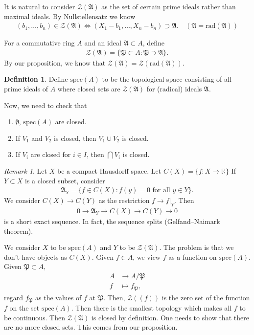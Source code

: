 \documentclass[12pt]{report}
\theoremstyle{plain}
\theoremstyle{remark}
\newtheorem*{remark}{Remark}
\theoremstyle{definition}
\newtheorem{definition}[theorem]{Definition}
\newcommand{\R}{\mathbb{R}}
\begin{document}
It is natural to consider $\mathcal{Z}(\mathfrak{A})$ as the set of certain prime ideals rather than maximal ideals. By Nullstellensatz we know
\begin{align*}
    (b_1,\dots,b_n)\in\mathcal{Z}(\mathfrak{A})\iff (X_1-b_1,\dots,X_n-b_n)\supset \mathfrak{A}.\quad (\mathfrak{A}=\mathrm{rad}(\mathfrak{A}))
\end{align*}

For a commutative ring $A$ and an ideal $\mathfrak{A}\subset A$, define
\begin{align*}
    \mathcal{Z}(\mathfrak{A})=\{\mathfrak{P}\subset A:\mathfrak{P}\supset\mathfrak{A}\}.
\end{align*}
By our proposition, we know that $\mathcal{Z}(\mathfrak{A})=\mathcal{Z}(\mathrm{rad}(\mathfrak{A}))$.

\begin{definition}
    Define $\mathrm{spec}(A)$ to be the topological space consisting of all prime ideals of $A$ where closed sets are $\mathcal{Z}(\mathfrak{A})$ for (radical) ideals $\mathfrak{A}$.
\end{definition}

Now, we need to check that
\begin{enumerate}
    \item $\emptyset$, $\mathrm{spec}(A)$ are closed.
    \item If $V_1$ and $V_2$ is closed, then $V_1\cup V_2$ is closed.
    \item If $V_i$ are closed for $i\in I$, then $\bigcap V_i$ is closed.
\end{enumerate}

\begin{remark}
    Let $X$ be a compact Hausdorff space. Let $C(X)=\{f:X\to\R\}$ If $Y\subset X$ is a closed subset, consider
    \begin{align*}
        \mathfrak{A}_Y=\{f\in C(X):f(y)=0\text{ for all }y\in Y\}.
    \end{align*}
    We consider $C(X)\to C(Y)$ as the restriction $f\to f|_Y$. Then
    \begin{align*}
        0\to\mathfrak{A}_Y\to C(X)\to C(Y)\to 0
    \end{align*}
    is a short exact sequence. In fact, the sequence splits (Gelfand–Naimark theorem).
\end{remark}

We consider $X$ to be $\mathrm{spec}(A)$ and $Y$ to be $\mathcal{Z}(\mathfrak{A})$. The problem is that we don't have objects as $C(X)$. Given $f\in A$, we view $f$ as a function on $\mathrm{spec}(A)$. Given $\mathfrak{P}\subset A$, 
\begin{align*}
    A &\to A/\mathfrak{P} \\
    f &\mapsto f_\mathfrak{P},
\end{align*}
regard $f_\mathfrak{P}$ as the values of $f$ at $\mathfrak{P}$. Then, $\mathcal{Z}((f))$ is the zero set of the function $f$ on the set $\mathrm{spec}(A)$. Then there is the smallest topology which makes all $f$ to be continuous. Then $\mathcal{Z}(\mathfrak{A})$ is closed by definition. One needs to show that there are no more closed sets. This comes from our proposition. \\
\end{document}
